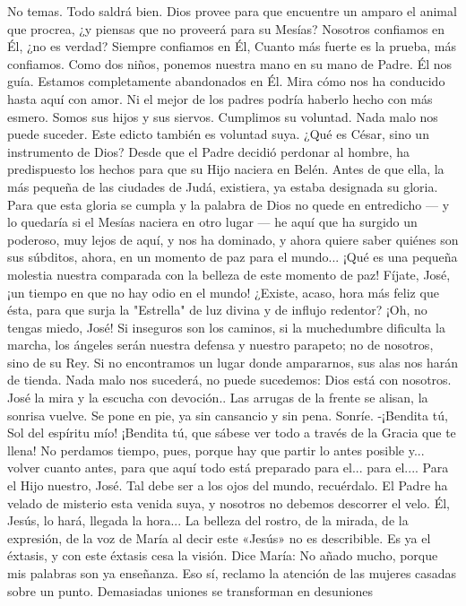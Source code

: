 \documentclass[12pt]{book} %
\begin{document}
No temas. Todo saldrá bien. Dios provee para que encuentre un amparo el animal que procrea, ¿y piensas que no proveerá para su Mesías? Nosotros confiamos en Él, ¿no es verdad? Siempre confiamos en Él, Cuanto más fuerte es la prueba, más confiamos. Como dos niños, ponemos nuestra mano en su mano de Padre. Él nos guía. Estamos completamente abandonados en Él. Mira cómo nos ha conducido hasta aquí con amor. Ni el mejor de los padres podría haberlo hecho con más esmero. Somos sus hijos y sus siervos. Cumplimos su voluntad. Nada malo nos puede suceder. Este edicto también es voluntad suya. ¿Qué es César, sino un instrumento de Dios? Desde que el Padre decidió perdonar al hombre, ha predispuesto los hechos para que su Hijo naciera en Belén. Antes de que ella, la más pequeña de las ciudades de Judá, existiera, ya estaba designada su gloria. Para que esta gloria se cumpla y la palabra de Dios no quede en entredicho — y lo quedaría si el Mesías naciera en otro lugar — he aquí que ha surgido un poderoso, muy lejos de aquí, y nos ha dominado, y ahora quiere saber quiénes son sus súbditos, ahora, en un momento de paz para el mundo... ¡Qué es una pequeña molestia nuestra comparada con la belleza de este momento de paz! Fíjate, José, ¡un tiempo en que no hay odio en el mundo! ¿Existe, acaso, hora más feliz que ésta, para que surja la "Estrella" de luz divina y de influjo redentor? ¡Oh, no tengas miedo, José! Si inseguros son los caminos, si la muchedumbre dificulta la marcha, los ángeles serán nuestra defensa y nuestro parapeto; no de nosotros, sino de su Rey. Si no encontramos un lugar donde ampararnos, sus alas nos harán de tienda. Nada malo nos sucederá, no puede sucedemos: Dios está con nosotros.                          
José la mira y la escucha con devoción.. Las arrugas de la frente se alisan, la sonrisa vuelve. Se pone en pie, ya sin 
cansancio y sin pena. Sonríe. 
-¡Bendita tú, Sol del espíritu mío! ¡Bendita tú, que sábese ver todo a través de la Gracia que te llena! No perdamos 
tiempo, pues, porque hay que partir lo antes posible y... volver cuanto antes, para que aquí todo está preparado para el... para el.... 
Para el Hijo nuestro, José. Tal debe ser a los ojos del mundo, recuérdalo. El Padre ha velado de misterio esta venida 
suya, y nosotros no debemos descorrer el velo. Él, Jesús, lo hará, llegada la hora... 
La belleza del rostro, de la mirada, de la expresión, de la voz de María al decir este «Jesús» no es describible. Es ya el 
éxtasis, y con este éxtasis cesa la visión. 
Dice María: 
No añado mucho, porque mis palabras son ya enseñanza. 
Eso sí, reclamo la atención de las mujeres casadas sobre un punto. Demasiadas uniones se transforman en desuniones 
\end{document}
